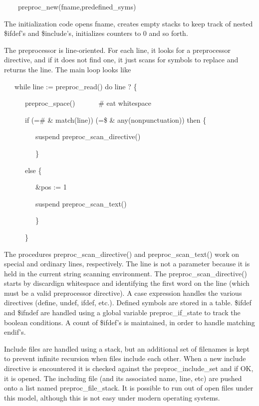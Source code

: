 \bigskip

{\ttfamily\mdseries
\ \ \ \ preproc\_new(fname,predefined\_syms)}

The initialization code opens fname, creates empty stacks to keep
track of nested \$ifdef's and \$include's, initializes counters to 0
and so forth.

The preprocessor is line-oriented. For each line, it looks for a
preprocessor directive, and if it does not find one, it just scans for
symbols to replace and returns the line. The main loop looks like

{\ttfamily\mdseries
\ \ \ while line := preproc\_read() do line ? \{}

{\ttfamily\mdseries
\ \ \ \ \ \ preproc\_space() \ \ \ \ \ \ \# eat whitespace}

{\ttfamily\mdseries
\ \ \ \ \ \ if (={\textquotedbl}\#{\textquotedbl} \& match({\textquotedbl}line{\textquotedbl})) {\textbar}
(={\textquotedbl}\${\textquotedbl} \& any(nonpunctuation)) then \{}

{\ttfamily\mdseries
\ \ \ \ \ \ \ \ \ suspend preproc\_scan\_directive()}

{\ttfamily\mdseries
\ \ \ \ \ \ \ \ \ \}}

{\ttfamily\mdseries
\ \ \ \ \ \ else \{}

{\ttfamily\mdseries
\ \ \ \ \ \ \ \ \ \&pos := 1}

{\ttfamily\mdseries
\ \ \ \ \ \ \ \ \ suspend preproc\_scan\_text()}

{\ttfamily\mdseries
\ \ \ \ \ \ \ \ \ \}}

{\ttfamily\mdseries
\ \ \ \ \ \ \}}


The procedures preproc\_scan\_directive() and preproc\_scan\_text()
work on special and ordinary lines, respectively.  The line is not a
parameter because it is held in the current string scanning
environment. The preproc\_scan\_directive() starts by discardign
whitespace and identifying the first word on the line (which must be a
valid preprocessor directive). A case expression handles the various
directives (define, undef, ifdef, etc.). Defined symbols are stored in
a table. \$ifdef and \$ifndef are handled using a global variable
preproc\_if\_state to track the boolean conditions. A count of
\$ifdef's is maintained, in order to handle matching endif's.

Include files are handled using a stack, but an additional set of
filenames is kept to prevent infinite recursion when files include
each other. When a new include directive is encountered it is checked
against the preproc\_include\_set and if OK, it is opened. The
including file (and its associated name, line, etc) are pushed onto a
list named preproc\_file\_stack. It is possible to run out of open
files under this model, although this is not easy under modern
operating systems.

